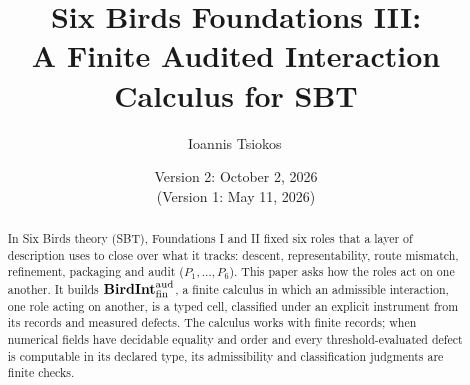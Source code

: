\documentclass[11pt]{article}
\title{Six Birds Foundations III:\\
A Finite Audited Interaction Calculus for SBT}
\author{Ioannis Tsiokos\,\orcidlink{0009-0009-7659-5964}}
\date{Version 2: October 2, 2026\\[2pt] \footnotesize (Version 1: May 11, 2026)}
\theoremstyle{definition}
\begin{document}
\maketitle
\thispagestyle{firstpage}

\begin{abstract}
In Six Birds theory (SBT), Foundations I and II fixed six roles that a layer of description uses to close over what it tracks: descent, representability, route mismatch, refinement, packaging and audit ($P_1,\ldots,P_6$). This paper asks how the roles act on one another. It builds $\mathbf{BirdInt}^{\mathrm{aud}}_{\mathrm{fin}}$, a finite calculus in which an admissible interaction, one role acting on another, is a typed cell, classified under an explicit instrument from its records and measured defects. The calculus works with finite records; when numerical fields have decidable equality and order and every threshold-evaluated defect is computable in its declared type, its admissibility and classification judgments are finite checks.


\end{abstract}
\end{document}
